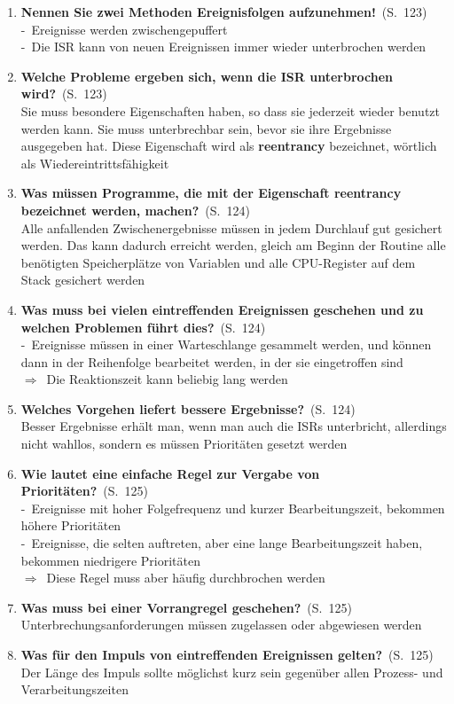 \documentclass[a4paper,12pt]{article}
\newcommand{\question}[3]{\pagebreak[3]\item {\textbf{#1?}}\ (S.\ #2)#3}
\newcommand{\statement}[3]{\pagebreak[3]\item {\textbf{#1!}}\ (S.\ #2)#3}
\newcommand{\catchword}[1]{\\-\ #1}
\newcommand{\normaltext}[1]{\\#1}
\newcommand{\result}[1]{\\ $\Rightarrow$\ #1}
\newcommand{\page}[1]{#1}
\newcommand{\important}[1]{\textbf{#1}}
\begin{document}
\begin{enumerate}
  \statement{Nennen Sie zwei Methoden Ereignisfolgen aufzunehmen}{\page{123}}
  {
    \catchword{Ereignisse werden zwischengepuffert}
    \catchword{Die ISR kann von neuen Ereignissen immer wieder unterbrochen werden}
  }

  \question{Welche Probleme ergeben sich, wenn die ISR unterbrochen wird}{\page{123}}
  {
    \normaltext{Sie muss besondere Eigenschaften haben, so dass sie jederzeit wieder
                benutzt werden kann. Sie muss unterbrechbar sein, bevor sie ihre
                Ergebnisse ausgegeben hat. Diese Eigenschaft wird als \important{reentrancy}
                bezeichnet, wörtlich als Wiedereintrittsfähigkeit}
  }

  \question{Was müssen Programme, die mit der Eigenschaft reentrancy
            bezeichnet werden, machen}{\page{124}}
  {
    \normaltext{Alle anfallenden Zwischenergebnisse müssen in jedem Durchlauf gut
                gesichert werden. Das kann dadurch erreicht werden, gleich am Beginn
                der Routine alle benötigten Speicherplätze von Variablen und alle
                CPU-Register auf dem Stack gesichert werden}
  }

  \question{Was muss bei vielen eintreffenden Ereignissen geschehen und zu welchen
            Problemen führt dies}{\page{124}}
  {
    \catchword{Ereignisse müssen in einer Warteschlange gesammelt werden, und können
               dann in der Reihenfolge bearbeitet werden, in der sie eingetroffen
               sind}
    \result{Die Reaktionszeit kann beliebig lang werden}
  }

  \question{Welches Vorgehen liefert bessere Ergebnisse}{\page{124}}
  {
    \normaltext{Besser Ergebnisse erhält man, wenn man auch die ISRs unterbricht,
                allerdings nicht wahllos, sondern es müssen Prioritäten gesetzt werden}
  }

  \question{Wie lautet eine einfache Regel zur Vergabe von Prioritäten}{\page{125}}
  {
    \catchword{Ereignisse mit hoher Folgefrequenz und kurzer Bearbeitungszeit, bekommen
               höhere Prioritäten}
    \catchword{Ereignisse, die selten auftreten, aber eine lange Bearbeitungszeit haben,
               bekommen niedrigere Prioritäten}
    \result{Diese Regel muss aber häufig durchbrochen werden}
  }

  \question{Was muss bei einer Vorrangregel geschehen}{\page{125}}
  {
    \normaltext{Unterbrechungsanforderungen müssen zugelassen oder abgewiesen werden}
  }

  \question{Was für den Impuls von eintreffenden Ereignissen gelten}{\page{125}}
  {
    \normaltext{Der Länge des Impuls sollte möglichst kurz sein gegenüber allen
                Prozess- und Verarbeitungszeiten}
  }


\end{enumerate}
\end{document}
